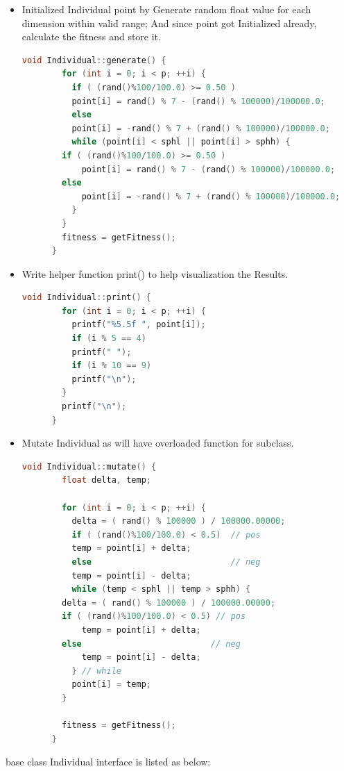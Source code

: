 \documentclass{article}
\begin{document}
\begin{CJK}{UTF8}{gbsn}
\begin{itemize}
  \item Initialized Individual point by Generate random float value for each dimension within valid range; And since point got Initialized already, calculate the fitness and store it.
    \begin{lstlisting}[language=c++]
      void Individual::generate() {
        for (int i = 0; i < p; ++i) {
          if ( (rand()%100/100.0) >= 0.50 )
          point[i] = rand() % 7 - (rand() % 100000)/100000.0;
          else
          point[i] = -rand() % 7 + (rand() % 100000)/100000.0;
          while (point[i] < sphl || point[i] > sphh) {
	    if ( (rand()%100/100.0) >= 0.50 )
            point[i] = rand() % 7 - (rand() % 100000)/100000.0;
	    else
            point[i] = -rand() % 7 + (rand() % 100000)/100000.0;
          } 
        }     
        fitness = getFitness();
      }
    \end{lstlisting}

  \item Write helper function print() to help visualization the Results.
    \begin{lstlisting}[language=c++]
      void Individual::print() {
        for (int i = 0; i < p; ++i) {
          printf("%5.5f ", point[i]);
          if (i % 5 == 4)
          printf(" ");
          if (i % 10 == 9)
          printf("\n");
        }
        printf("\n");
      }
    \end{lstlisting}

  \item Mutate Individual as will have overloaded function for subclass.
    \begin{lstlisting}[language=c++]
      void Individual::mutate() {
        float delta, temp;

        for (int i = 0; i < p; ++i) {
          delta = ( rand() % 100000 ) / 100000.00000;
          if ( (rand()%100/100.0) < 0.5)  // pos
          temp = point[i] + delta;
          else                            // neg
          temp = point[i] - delta;
          while (temp < sphl || temp > sphh) {
	    delta = ( rand() % 100000 ) / 100000.00000;
	    if ( (rand()%100/100.0) < 0.5) // pos
            temp = point[i] + delta;
	    else                          // neg
            temp = point[i] - delta;
          } // while
          point[i] = temp;
        }
        
        fitness = getFitness();
      }
    \end{lstlisting}
  \end{itemize}
  base class Individual interface is listed as below: 
  


\end{CJK}
\end{document}
